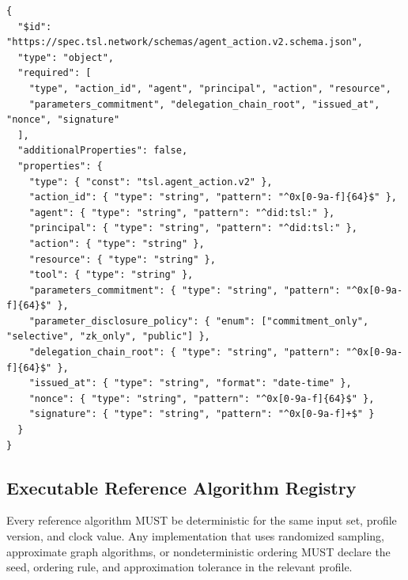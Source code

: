 \documentclass[11pt]{article}
\begin{document}
\begin{lstlisting}[style=tslcode]
{
  "$id": "https://spec.tsl.network/schemas/agent_action.v2.schema.json",
  "type": "object",
  "required": [
    "type", "action_id", "agent", "principal", "action", "resource",
    "parameters_commitment", "delegation_chain_root", "issued_at", "nonce", "signature"
  ],
  "additionalProperties": false,
  "properties": {
    "type": { "const": "tsl.agent_action.v2" },
    "action_id": { "type": "string", "pattern": "^0x[0-9a-f]{64}$" },
    "agent": { "type": "string", "pattern": "^did:tsl:" },
    "principal": { "type": "string", "pattern": "^did:tsl:" },
    "action": { "type": "string" },
    "resource": { "type": "string" },
    "tool": { "type": "string" },
    "parameters_commitment": { "type": "string", "pattern": "^0x[0-9a-f]{64}$" },
    "parameter_disclosure_policy": { "enum": ["commitment_only", "selective", "zk_only", "public"] },
    "delegation_chain_root": { "type": "string", "pattern": "^0x[0-9a-f]{64}$" },
    "issued_at": { "type": "string", "format": "date-time" },
    "nonce": { "type": "string", "pattern": "^0x[0-9a-f]{64}$" },
    "signature": { "type": "string", "pattern": "^0x[0-9a-f]+$" }
  }
}
\end{lstlisting}

\subsection{Executable Reference Algorithm Registry}

Every reference algorithm MUST be deterministic for the same input set, profile version, and clock value. Any implementation that uses randomized sampling, approximate graph algorithms, or nondeterministic ordering MUST declare the seed, ordering rule, and approximation tolerance in the relevant profile.
\end{document}
